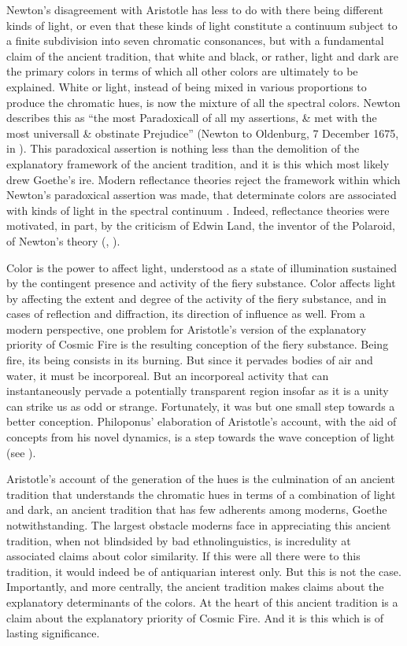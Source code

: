 Newton's disagreement with Aristotle has less to do with there being different kinds of light, or even that these kinds of light constitute a continuum subject to a finite subdivision into seven chromatic consonances, but with a fundamental claim of the ancient tradition, that white and black, or rather, light and dark are the primary colors in terms of which all other colors are ultimately to be explained. White or light, instead of being mixed in various proportions to produce the chromatic hues, is now the mixture of all the spectral colors. Newton describes this as ``the most Paradoxicall of all my assertions, \& met with the most universall \& obstinate Prejudice'' (Newton to Oldenburg, 7 December 1675, in \citealt[385]{Turnbull:1959kx}). This paradoxical assertion is nothing less than the demolition of the explanatory framework of the ancient tradition, and it is this which most likely drew Goethe's ire. Modern reflectance theories reject the framework within which Newton's paradoxical assertion was made, that determinate colors are associated with kinds of light in the spectral continuum \citep{Hilbert:1987jq}. Indeed, reflectance theories were motivated, in part, by the criticism of Edwin Land, the inventor of the Polaroid, of Newton's theory (\citealt{Land:1971aa}, \citealt{Land:1977aa}).

Color is the power to affect light, understood as a state of illumination sustained by the contingent presence and activity of the fiery substance. Color affects light by affecting the extent and degree of the activity of the fiery substance, and in cases of reflection and diffraction, its direction of influence as well. From a modern perspective, one problem for Aristotle's version of the explanatory priority of Cosmic Fire is the resulting conception of the fiery substance. Being fire, its being consists in its burning. But since it pervades bodies of air and water, it must be incorporeal. But an incorporeal activity that can instantaneously pervade a potentially transparent region insofar as it is a unity can strike us as odd or strange. Fortunately, it was but one small step towards a better conception. Philoponus' elaboration of Aristotle's account, with the aid of concepts from his novel dynamics, is a step towards the wave conception of light (see \citealt{Wolff:1987vn}).

Aristotle's account of the generation of the hues is the culmination of an ancient tradition that understands the chromatic hues in terms of a combination of light and dark, an ancient tradition that has few adherents among moderns, Goethe notwithstanding. The largest obstacle moderns face in appreciating this ancient tradition, when not blindsided by bad ethnolinguistics, is incredulity at associated claims about color similarity. If this were all there were to this tradition, it would indeed be of antiquarian interest only. But this is not the case. Importantly, and more centrally, the ancient tradition makes claims about the explanatory determinants of the colors. At the heart of this ancient tradition is a claim about the explanatory priority of Cosmic Fire. And it is this which is of lasting significance. 



